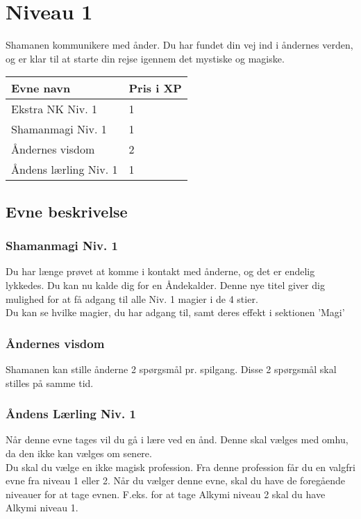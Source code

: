 \chapter{Niveau 1}
Shamanen kommunikere med ånder. Du har fundet din vej ind i åndernes verden, og er klar til at starte din rejse igennem det mystiske og magiske.

\begin{table}[H]
    \centering
    \begin{tabular}{|p{}|p{}|}
    \rowcolor{cerulean!80}\hline
        Evne navn & Pris i XP \\\hline
         Ekstra NK Niv. 1 & 1\\\hline
         Shamanmagi Niv. 1 & 1\\\hline
         Åndernes visdom & 2\\\hline
         Åndens lærling Niv. 1 & 1\\\hline
    \end{tabular}
\end{table}

\section{Evne beskrivelse} 



\subsection{Shamanmagi Niv. 1}
Du har længe prøvet at komme i kontakt med ånderne, og det er endelig lykkedes. Du kan nu kalde dig for en Åndekalder. Denne nye titel giver dig mulighed for at få adgang til alle Niv. 1 magier i de 4 stier.\\
Du kan se hvilke magier, du har adgang til, samt deres effekt i sektionen 'Magi'\\

\subsection{Åndernes visdom}
Shamanen kan stille ånderne 2 spørgsmål pr. spilgang. Disse 2 spørgsmål skal stilles på samme tid. 

\subsection{Åndens Lærling Niv. 1}
Når denne evne tages vil du gå i lære ved en ånd. Denne skal vælges med omhu, da den ikke kan vælges om senere.\\
Du skal du vælge en ikke magisk profession. Fra denne profession får du en valgfri evne fra niveau 1 eller 2. Når du vælger denne evne, skal du have de foregående niveauer for at tage evnen. F.eks. for at tage Alkymi niveau 2 skal du have Alkymi niveau 1.

